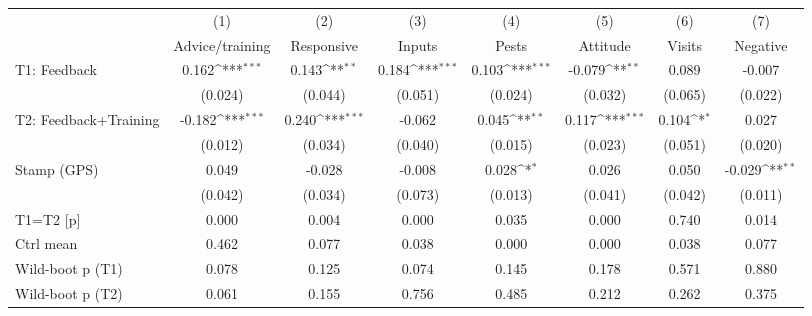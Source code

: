 {
\def\sym#1{\ifmmode^{#1}\else\(^{#1}\)\fi}
\begin{tabular}{l*{7}{c}}
\toprule
                    &\multicolumn{1}{c}{(1)}&\multicolumn{1}{c}{(2)}&\multicolumn{1}{c}{(3)}&\multicolumn{1}{c}{(4)}&\multicolumn{1}{c}{(5)}&\multicolumn{1}{c}{(6)}&\multicolumn{1}{c}{(7)}\\
                    &\multicolumn{1}{c}{Advice/training}&\multicolumn{1}{c}{Responsive}&\multicolumn{1}{c}{Inputs}&\multicolumn{1}{c}{Pests}&\multicolumn{1}{c}{Attitude}&\multicolumn{1}{c}{Visits}&\multicolumn{1}{c}{Negative}\\
\midrule
T1: Feedback        &       0.162\sym{***}&       0.143\sym{**} &       0.184\sym{***}&       0.103\sym{***}&      -0.079\sym{**} &       0.089         &      -0.007         \\
                    &     (0.024)         &     (0.044)         &     (0.051)         &     (0.024)         &     (0.032)         &     (0.065)         &     (0.022)         \\
T2: Feedback+Training&      -0.182\sym{***}&       0.240\sym{***}&      -0.062         &       0.045\sym{**} &       0.117\sym{***}&       0.104\sym{*}  &       0.027         \\
                    &     (0.012)         &     (0.034)         &     (0.040)         &     (0.015)         &     (0.023)         &     (0.051)         &     (0.020)         \\
Stamp (GPS)         &       0.049         &      -0.028         &      -0.008         &       0.028\sym{*}  &       0.026         &       0.050         &      -0.029\sym{**} \\
                    &     (0.042)         &     (0.034)         &     (0.073)         &     (0.013)         &     (0.041)         &     (0.042)         &     (0.011)         \\
\midrule
T1=T2 [p]           &       0.000         &       0.004         &       0.000         &       0.035         &       0.000         &       0.740         &       0.014         \\
Ctrl mean           &       0.462         &       0.077         &       0.038         &       0.000         &       0.000         &       0.038         &       0.077         \\
Wild-boot p (T1)    &       0.078         &       0.125         &       0.074         &       0.145         &       0.178         &       0.571         &       0.880         \\
Wild-boot p (T2)    &       0.061         &       0.155         &       0.756         &       0.485         &       0.212         &       0.262         &       0.375         \\

\end{tabular}}
